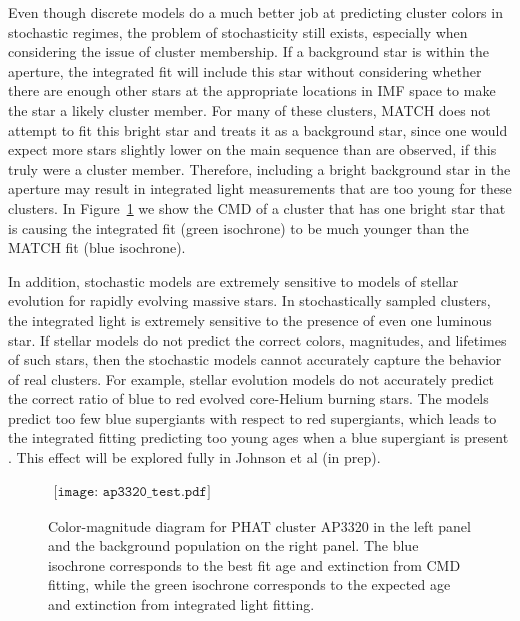 \documentclass{emulateapj}
\begin{document}
Even though discrete models do a much better job at predicting cluster colors in stochastic regimes, the problem of stochasticity still exists, especially when considering the issue of cluster membership.  If a background star is within the aperture, the integrated fit will include this star without considering whether there are enough other stars at the appropriate locations in IMF space to make the star a likely cluster member.  For many of these clusters, MATCH does not attempt to fit this bright star and treats it as a background star, since one would expect more stars slightly lower on the main sequence than are observed, if this truly were a cluster member.  Therefore, including a bright background star in the aperture may result in integrated light measurements that are too young for these clusters.  In Figure~\ref{fig:ap3320} we show the CMD of a cluster that has one bright star that is causing the integrated fit (green isochrone) to be much younger than the MATCH fit (blue isochrone). 

In addition, stochastic models are extremely sensitive to models of stellar evolution for rapidly evolving massive stars.  In stochastically sampled clusters, the integrated light is extremely sensitive to the presence of even one luminous star.  If stellar models do not predict the correct colors, magnitudes, and lifetimes of such stars, then the stochastic models cannot accurately capture the behavior of real clusters.  For example, stellar evolution models do not accurately predict the correct ratio of blue to red evolved core-Helium burning stars.  The models predict too few blue supergiants with respect to red supergiants, which leads to the integrated fitting predicting too young ages when a blue supergiant is present \citep{Dohm02, McQuinn11}.  This effect will be explored fully in Johnson et al (in prep).

\begin{figure}[ht!]
   \begin{center}$
     \begin{array}{cc}
        \texttt{[image: ap3320\_test.pdf]} 
    \end{array}$
 \end{center}
  \caption{Color-magnitude diagram for PHAT cluster AP3320 in the left panel and the background population on the right panel.  The blue isochrone corresponds to the best fit age and extinction from CMD fitting, while the green isochrone corresponds to the expected age and extinction from integrated light fitting.}
  \label{fig:ap3320}
\end{figure}
\end{document}
